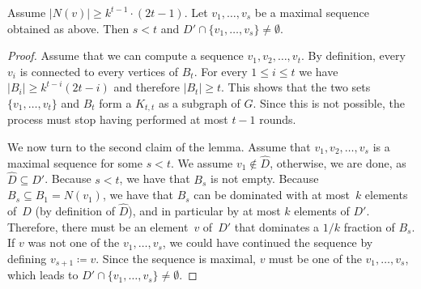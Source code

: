 \begin{lemma}\label{lem:sequence}
Assume $|N(v)|\geq k^{t-1}\cdot (2t-1)$. Let $v_1,\ldots, v_s$
be a maximal sequence obtained as above. Then $s<t$ and
$D'\cap \{v_1,\ldots, v_s\}\neq \emptyset$.
\end{lemma}
\begin{proof}
  Assume that we can compute a sequence $v_1,v_2,\ldots,v_t$. By definition,
  every $v_i$ is connected to every vertices of $B_t$.
  For every $1\leq i\leq t$ we have $|B_i|\geq k^{t-i}(2t-i)$
  and therefore
  $|B_t|\ge t$. This shows that the two sets
  $\{v_1,\ldots,v_t\}$ and $B_t$ form a $K_{t,t}$ as a subgraph of $G$.
  Since this is not possible, the process must stop having performed at
  most $t-1$ rounds.

  We now turn to the second claim of the lemma. Assume that
  $v_1,v_2,\ldots,v_s$ is a maximal sequence for some $s < t$. We assume
  $v_1\not\in \hat{D}$, otherwise, we are done, as $\hat{D}\subseteq D'$.
  Because $s <t$,
  we have that $B_s$ is not empty. Because $B_s \subseteq B_1 = N(v_1)$, we have
  that $B_s$ can be dominated with at most~$k$ elements of~$D$ (by definition of $\hat{D}$), and in particular by at most $k$ elements of $D'$. Therefore,
  there must be an element~$v$ of~$D'$ that dominates a $1/k$ fraction of $B_s$.
  If $v$ was not one of the $v_1,\ldots,v_s$, we could have continued the
  sequence by defining $v_{s+1} \coloneqq v$.
  Since the sequence is maximal, $v$ must be one of the $v_1,\ldots,v_s$,
  which leads to $D'\cap \{v_1,\ldots, v_s\}\neq\emptyset$.

%
%
%
\end{proof}

